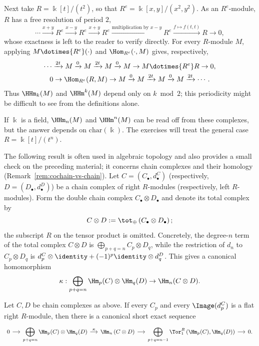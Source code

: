 Next take $R=\Bbbk[t]/(t^2)$, so that
$R^e=\Bbbk[x,y]/(x^2,y^2)$. As an $R^e$-module, $R$ has a free resolution
of period $2$,
\[
\cdots\xrightarrow{x+y}R^e\xrightarrow{x-y}R^e\xrightarrow{x+y}R^e
\xrightarrow{\text{multiplication by }x-y}R^e\xrightarrow{f\mapsto f(t,t)}R\to0,
\]
whose exactness is left to the reader to verify directly. For every
$R$-module $M$, applying $M\dotimes{R^e}(\cdot)$ and
$\Hom_{R^e}(\cdot,M)$ gives, respectively,
\begin{gather*}
\cdots\xrightarrow{2t}M\xrightarrow{0}M\xrightarrow{2t}M\xrightarrow{0}M
\to M\dotimes{R^e}R\to0,\\
0\to\Hom_{R^e}(R,M)\to M\xrightarrow{0}M\xrightarrow{2t}M
\xrightarrow{0}M\xrightarrow{2t}\cdots.
\end{gather*}
Thus $\HHm_k(M)$ and $\HHm^k(M)$ depend only on $k\bmod2$; this periodicity
might be difficult to see from the definitions alone.

If $\Bbbk$ is a field, $\HHm_n(M)$ and $\HHm^n(M)$ can be read off from
these complexes, but the answer depends on $\mathrm{char}(\Bbbk)$. The
exercises will treat the general case $R=\Bbbk[t]/(t^n)$.

The following result is often used in algebraic topology and also provides a
small check on the preceding material; it concerns chain complexes and their
homology (Remark~\ref{rem:cochain-vs-chain}). Let
$C=(C_\bullet,d^C_\bullet)$ (respectively,
$D=(D_\bullet,d^D_\bullet)$) be a chain complex of right $R$-modules
(respectively, left $R$-modules). Form the double chain complex
$C_\bullet\otimes D_\bullet$ and denote its total complex by
\[
C\otimes D:=\tot_{\oplus}\left(C_\bullet\otimes D_\bullet\right);
\]
the subscript $R$ on the tensor product is omitted. Concretely, the
degree-$n$ term of the total complex $C\otimes D$ is
$\bigoplus_{p+q=n}C_p\otimes D_q$, while the restriction of $d_n$ to
$C_p\otimes D_q$ is
$d^C_p\otimes\identity+(-1)^p\identity\otimes d^D_q$. This gives a canonical
homomorphism
\[
\kappa:\bigoplus_{p+q=n}\Hm_p(C)\otimes\Hm_q(D)\to
\Hm_n(C\otimes D).
\]

\begin{theorem}\label{prop:Kunneth-homology}
Let $C,D$ be chain complexes as above. If every $C_p$ and every
$\Image(d^C_p)$ is a flat right $R$-module, then there is a canonical short
exact sequence
\[
\begin{tikzcd}[column sep=small, every cell/.append style={font = \small}]
0 \arrow[r] & \displaystyle\bigoplus_{p+q=n} \Hm_p(C) \otimes \Hm_q(D)
\arrow[r, "\kappa"] & \Hm_n\left(C \otimes D \right) \arrow[r] &
\displaystyle\bigoplus_{p+q=n-1} \Tor_1^R\left( \Hm_p(C), \Hm_q(D) \right)
\arrow[r] & 0.
\end{tikzcd}
\]
\end{theorem}


